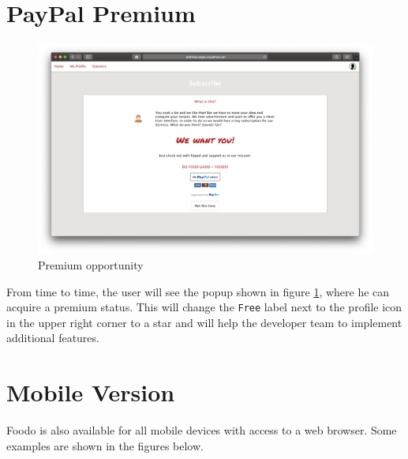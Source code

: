 \section*{PayPal Premium}
\vspace{-2em}
\begin{figure}[H]
	\captionsetup{justification=centering}
	\begin{center}
		\includegraphics[scale=0.25]{Ressourcen/img/screenshots/screenshotR.png}
		\vspace{-2em}
		\caption{Premium opportunity}
		\label{fig:paypal}
	\end{center}
\end{figure}
From time to time, the user will see the popup shown in figure \ref{fig:paypal}, where he can acquire a premium status. This will change the \texttt{Free} label next to the profile icon in the upper right corner to a star and will help the developer team to implement additional features.
\clearpage
\section*{Mobile Version}
Foodo is also available for all mobile devices with access to a web browser. Some examples are shown in the figures below.

